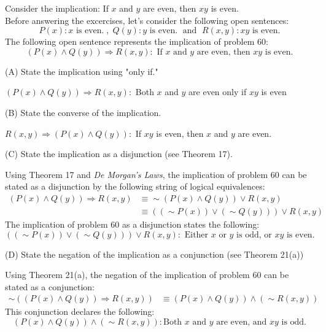\documentclass[12pt]{article}
\newenvironment{problem}[2][Problem]{\begin{trivlist}
		\item[\hskip \labelsep {\bfseries #1}\hskip \labelsep {\bfseries #2.}]}{\end{trivlist}}
\newenvironment{solution}[2][Solution]{\begin{trivlist}
		\item[\hskip \labelsep {\bfseries #1}\hskip \labelsep {\bfseries #2.}]}{\end{trivlist}}
\begin{document}
\begin{problem}{60}
	Consider the implication: If $x$ and $y$ are even, then $xy$ is even.\\
	Before answering the excercises, let's consider the following open sentences:
	\begin{equation*}
		P(x) : x \text{ is even.} \; ,\; Q(y) : y \text{ is even.} \; \text{ and } \; R(x,y) : xy \text{ is even.}
	\end{equation*}
	The following open sentence represents the implication of problem 60:
	\begin{equation*}
		(P(x)\wedge Q(y)) \Rightarrow R(x,y): \text{ If } x \text{ and } y \text{ are even, then } xy \text{ is even.}
	\end{equation*}

(A) State the implication using "only if."
\begin{solution}{a}
	$(P(x)\wedge Q(y)) \Rightarrow R(x,y):$ Both $x$ and $y$ are even only if $xy$ is even
\end{solution}

(B) State the converse of the implication.
\begin{solution}{b}
		$R(x,y) \Rightarrow (P(x)\wedge Q(y)):$ If $xy$ is even, then $x$ and $y$ are even.
\end{solution}

(C) State the implication as a disjunction (see Theorem 17).
\begin{solution}{c}
	Using Theorem 17 and \textit{De Morgan's Laws}, the implication of problem 60 can be stated as a disjunction by the following string of logical equivalences:
	\begin{align*}
			 (P(x)\wedge Q(y)) \Rightarrow R(x,y) &\equiv \sim(P(x)\wedge Q(y))\vee R(x,y)\\
			 & \equiv ((\sim P(x))\vee(\sim Q(y)))\vee R(x,y)
	\end{align*}
The implication of problem 60 as a disjunction states the following:
	\begin{equation*}
		((\sim P(x))\vee(\sim Q(y)))\vee R(x,y) : \text{ Either } x \text{ or } y \text{ is odd, or } xy \text{ is even.} 
	\end{equation*}
\end{solution}

(D) State the negation of the implication as a conjunction (see Theorem 21(a))
\begin{solution}{d}
Using Theorem 21(a), the negation of the implication of problem 60 can be stated as a conjunction:
\begin{align*}
	\sim ((P(x)\wedge Q(y)) \Rightarrow R(x,y)) &\equiv (P(x)\wedge Q(y)) \wedge (\sim R(x,y))
\end{align*}
This conjunction declares the following:
\begin{equation*}
	(P(x)\wedge Q(y)) \wedge (\sim R(x,y)) : \text{Both } x \text{ and } y \text{ are even, and } xy \text{ is odd.}
\end{equation*}
\end{solution}
\end{problem}
\end{document}
